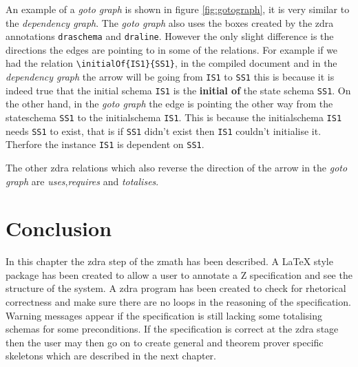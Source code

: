 An example of a \emph{goto graph} is shown in figure \ref{fig:gotograph}, it is very similar to the \emph{dependency graph}. The \emph{goto graph} also uses the boxes created by the \gls{zdra} annotations \verb|draschema| and \verb|draline|. However the only slight difference is the directions the edges are pointing to in some of the relations. For example if we had the relation \verb|\initialOf{IS1}{SS1}|, in the compiled document and in the \emph{dependency graph} the arrow will be going from \verb|IS1| to \verb|SS1| this is because it is indeed true that the initial schema \verb|IS1| is the \textbf{initial of} the state schema \verb|SS1|. On the other hand, in the \emph{goto graph} the edge is pointing the other way from the stateschema \verb|SS1| to the initialschema \verb|IS1|. This is because the initialschema \verb|IS1| needs \verb|SS1| to exist, that is if \verb|SS1| didn't exist then \verb|IS1| couldn't initialise it. Therfore the instance \verb|IS1| is dependent on \verb|SS1|.

The other \gls{zdra} relations which also reverse the direction of the arrow in the \emph{goto graph} are \emph{uses},\emph{requires} and \emph{totalises}.

\section{Conclusion}
In this chapter the \gls{zdra} step of the \gls{zmath} has been described. A \LaTeX{} style package has been created to allow a user to annotate a Z specification and see the structure of the system. A \gls{zdra} program has been created to check for rhetorical correctness and make sure there are no loops in the reasoning of the specification. Warning messages appear if the specification is still lacking some totalising schemas for some preconditions. If the specification is correct at the \gls{zdra} stage then the user may then go on to create general and theorem prover specific skeletons which are described in the next chapter.
